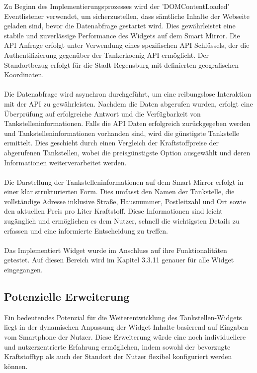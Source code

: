 \noindent
Zu Beginn des Implementierungsprozesses wird der 'DOMContentLoaded' Eventlistener verwendet, um sicherzustellen, dass sämtliche Inhalte der Webseite geladen sind, bevor die Datenabfrage gestartet wird. Dies gewährleistet eine stabile und zuverlässige Performance des Widgets auf dem Smart Mirror. Die API Anfrage erfolgt unter Verwendung eines spezifischen API Schlüssels, der die Authentifizierung gegenüber der Tankerkoenig API ermöglicht. Der Standortbezug erfolgt für die Stadt Regensburg mit definierten geografischen Koordinaten. \\ \\
\noindent
Die Datenabfrage wird asynchron durchgeführt, um eine reibungslose Interaktion mit der API zu gewährleisten. Nachdem die Daten abgerufen wurden, erfolgt eine Überprüfung auf erfolgreiche Antwort und die Verfügbarkeit von Tankstelleninformationen. Falls die API Daten erfolgreich zurückgegeben werden und Tankstelleninformationen vorhanden sind, wird die günstigste Tankstelle ermittelt. Dies geschieht durch einen Vergleich der Kraftstoffpreise der abgerufenen Tankstellen, wobei die preisgünstigste Option ausgewählt und deren Informationen weiterverarbeitet werden. \\ \\
\noindent
Die Darstellung der Tankstelleninformationen auf dem Smart Mirror erfolgt in einer klar strukturierten Form. Dies umfasst den Namen der Tankstelle, die vollständige Adresse inklusive Straße, Hausnummer, Postleitzahl und Ort sowie den aktuellen Preis pro Liter Kraftstoff. Diese Informationen sind leicht zugänglich und ermöglichen es dem Nutzer, schnell die wichtigsten Details zu erfassen und eine informierte Entscheidung zu treffen. \\ \\
\noindent
Das Implementiert Widget wurde im Anschluss auf ihre Funktionalitäten getestet. Auf diesen Bereich wird im Kapitel 3.3.11 genauer für alle Widget eingegangen.

\subsection*{Potenzielle Erweiterung}
Ein bedeutendes Potenzial für die Weiterentwicklung des Tankstellen-Widgets liegt in der dynamischen Anpassung der Widget Inhalte basierend auf Eingaben vom Smartphone der Nutzer. Diese Erweiterung würde eine noch individuellere und nutzerzentrierte Erfahrung ermöglichen, indem sowohl der bevorzugte Kraftstofftyp als auch der Standort der Nutzer flexibel konfiguriert werden können.

